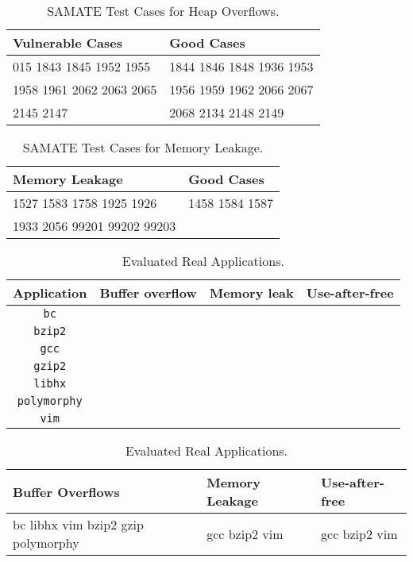 \begin{table}[!t]
\centering
\begin{tabular}{l|l}
\hline
{\bf \small Vulnerable Cases } & {\bf \small Good Cases} \\
\hline
015 1843 1845 1952 1955 & 1844 1846 1848 1936 1953\\
1958 1961 2062 2063 2065 & 1956 1959 1962 2066 2067 \\
2145 2147 & 2068 2134 2148 2149\\  
\hline
\end{tabular}
\caption{SAMATE Test Cases for Heap Overflows. 
\label{table:SAMATESRDOverflow}}
\end{table}

\begin{table}[!t]
\centering
\begin{tabular}{l|l}
\hline
{\bf \small Memory Leakage } & {\bf \small Good Cases} \\
\hline
1527 1583 1758 1925 1926 & 1458 1584 1587\\
1933 2056 99201 99202 99203 &   \\
\hline
\end{tabular}
\caption{SAMATE Test Cases for Memory Leakage. 
\label{table:SAMATESRDLeak}}
\end{table}



\begin{table}[!t]
\small
\centering
\begin{tabular}{c|ccc}
\textbf{Application} & \textbf{Buffer overflow} & \textbf{Memory leak} & \textbf{Use-after-free} \\
\hline
\texttt{bc}			& & & \\
\texttt{bzip2}		& & & \\
\texttt{gcc}		& & & \\
\texttt{gzip2}		& & & \\
\texttt{libhx}		& & & \\
\texttt{polymorphy}	& & & \\
\texttt{vim}		& & & \\
\end{tabular}



\begin{tabular}{l|l|l}
\hline
{\bf \small Buffer Overflows} & {\bf \small Memory Leakage} & {\bf \small Use-after-free}\\
\hline
bc libhx vim bzip2 gzip
polymorphy & gcc bzip2 vim & gcc bzip2 vim\\
\hline
\end{tabular}
\caption{Evaluated Real Applications. 
\label{table:realapps}}
\end{table}

